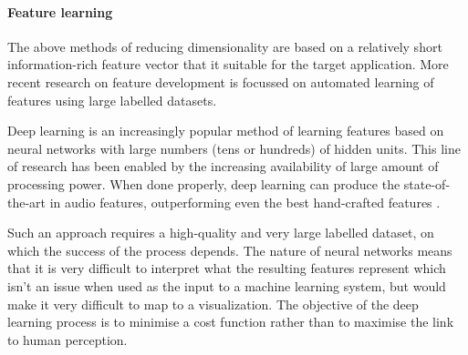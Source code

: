 \paragraph{Feature learning}
The above methods of reducing dimensionality are based on a relatively short
information-rich feature vector that it suitable for the target application.
More recent research on feature development is focussed on automated learning
of features using large labelled datasets.

Deep learning is an increasingly popular method of learning features based on
neural networks with large numbers (tens or hundreds) of hidden units. This
line of research has been enabled by the increasing availability of large
amount of processing power. When done properly, deep learning can produce the
state-of-the-art in audio features, outperforming even the best hand-crafted
features \citep{Hamel2010,Sigtia2014}.

Such an approach requires a high-quality and very large labelled dataset, on
which the success of the process depends. The nature of neural networks means
that it is very difficult to interpret what the resulting features represent
which isn't an issue when used as the input to a machine learning system, but
would make it very difficult to map to a visualization. The objective of the
deep learning process is to minimise a cost function rather than to maximise
the link to human perception.
